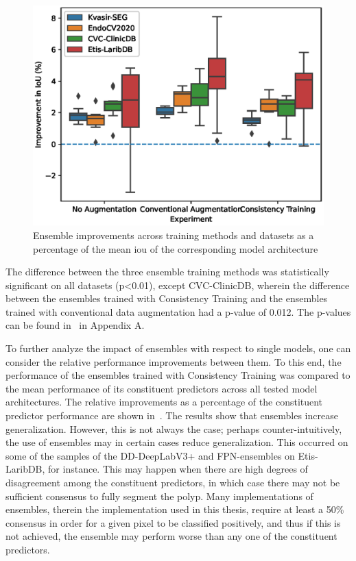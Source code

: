 \begin{figure}
    \centering
    \includegraphics[width=\linewidth]{illustrations/ensemble_improvements.eps}
    \caption[Ensemble improvements across training methods]{Ensemble improvements across training methods and datasets as a percentage of the mean \gls{iou} of the corresponding model architecture}
    \label{fig:ensemble_improvements_across_training_methods}
\end{figure}

The difference between the three ensemble training methods was statistically significant on all datasets (p<0.01), except CVC-ClinicDB, wherein the difference between the ensembles trained with Consistency Training and the ensembles trained with conventional data augmentation had a p-value of 0.012. The p-values can be found in~ in Appendix A. 

To further analyze the impact of ensembles with respect to single models, one can consider the relative performance improvements between them. To this end, the performance of the ensembles trained with Consistency Training was compared to the mean performance of its constituent predictors across all tested model architectures. The relative improvements as a percentage of the constituent predictor performance are shown in~. The results show that ensembles increase generalization. However, this is not always the case; perhaps counter-intuitively, the use of ensembles may in certain cases reduce generalization. This occurred on some of the samples of the DD-DeepLabV3+ and FPN-ensembles on Etis-LaribDB, for instance. This may happen when there are high degrees of disagreement among the constituent predictors, in which case there may not be sufficient consensus to fully segment the polyp. Many implementations of ensembles, therein the implementation used in this thesis, require at least a 50\% consensus in order for a given pixel to be classified positively, and thus if this is not achieved, the ensemble may perform worse than any one of the constituent predictors. 

